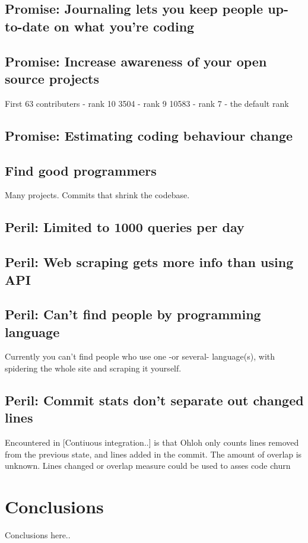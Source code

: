 \documentclass{sig-alternate}
\begin{document}
\subsection{Promise: Journaling lets you keep people up-to-date on what you're coding}


\subsection{Promise: Increase awareness of your open source projects}

First 63 contributers - rank 10
3504 - rank 9
10583 - rank 7 - the default rank


\subsection{Promise: Estimating coding behaviour change}


\subsection{Find good programmers}
Many projects. Commits that shrink the codebase.


\subsection{Peril: Limited to 1000 queries per day}


\subsection{Peril: Web scraping gets more info than using API}


\subsection{Peril: Can't find people by programming language}
Currently you can't find people who use one -or several- language(s), with spidering the whole site and scraping it yourself.


\subsection{Peril: Commit stats don't separate out changed lines}
Encountered in [Contiuous integration..] is that Ohloh only counts lines removed from the previous state, and lines added in the commit. The amount of overlap is unknown. Lines changed or overlap measure could be used to asses code churn



\section{Conclusions}
Conclusions here..





\end{document}
